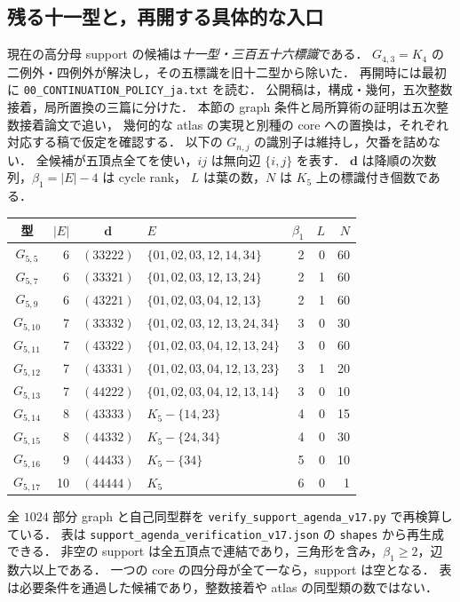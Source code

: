 \subsection{残る十一型と，再開する具体的な入口}
\label{ns17:support-agenda}

現在の高分母 support の候補は\emph{十一型・三百五十六標識}である．
$G_{4,3}=K_4$ の二例外・四例外が解決し，その五標識を旧十二型から除いた．
再開時には最初に \nolinkurl{00_CONTINUATION_POLICY_ja.txt} を読む．
公開稿は，構成・幾何，五次整数接着，局所置換の三篇に分けた．
本節の graph 条件と局所算術の証明は五次整数接着論文で追い，
幾何的な atlas の実現と別種の core への置換は，それぞれ対応する稿で仮定を確認する．
以下の $G_{n,j}$ の識別子は維持し，欠番を詰めない．
全候補が五頂点全てを使い，$ij$ は無向辺 $\{i,j\}$ を表す．
$\mathbf d$ は降順の次数列，$\beta_1=|E|-4$ は cycle rank，
$L$ は葉の数，$N$ は $K_5$ 上の標識付き個数である．

\begin{center}
\footnotesize
\setlength{\tabcolsep}{3pt}
\begin{tabular}{crclrrr}
型 & $|E|$ & $\mathbf d$ & $E$ & $\beta_1$ & $L$ & $N$\\\hline
$G_{5,5}$ & 6 & $(33222)$ & $\{01,02,03,12,14,34\}$ & 2 & 0 & 60 \\
$G_{5,7}$ & 6 & $(33321)$ & $\{01,02,03,12,13,24\}$ & 2 & 1 & 60 \\
$G_{5,9}$ & 6 & $(43221)$ & $\{01,02,03,04,12,13\}$ & 2 & 1 & 60 \\
$G_{5,10}$ & 7 & $(33332)$ & $\{01,02,03,12,13,24,34\}$ & 3 & 0 & 30 \\
$G_{5,11}$ & 7 & $(43322)$ & $\{01,02,03,04,12,13,24\}$ & 3 & 0 & 60 \\
$G_{5,12}$ & 7 & $(43331)$ & $\{01,02,03,04,12,13,23\}$ & 3 & 1 & 20 \\
$G_{5,13}$ & 7 & $(44222)$ & $\{01,02,03,04,12,13,14\}$ & 3 & 0 & 10 \\
$G_{5,14}$ & 8 & $(43333)$ & $K_5-\{14,23\}$ & 4 & 0 & 15 \\
$G_{5,15}$ & 8 & $(44332)$ & $K_5-\{24,34\}$ & 4 & 0 & 30 \\
$G_{5,16}$ & 9 & $(44433)$ & $K_5-\{34\}$ & 5 & 0 & 10 \\
$G_{5,17}$ & 10 & $(44444)$ & $K_5$ & 6 & 0 & 1 \\
\end{tabular}
\end{center}

全 $1024$ 部分 graph と自己同型群を
\nolinkurl{verify_support_agenda_v17.py} で再検算している．
表は \nolinkurl{support_agenda_verification_v17.json} の \texttt{shapes} から再生成できる．
非空の support は全五頂点で連結であり，三角形を含み，$\beta_1\ge2$，辺数六以上である．
一つの core の四分母が全て一なら，support は空となる．
表は必要条件を通過した候補であり，整数接着や atlas の同型類の数ではない．

